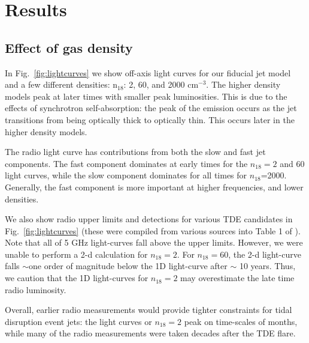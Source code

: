 \documentclass[usenatbib,fleqn]{mnras}
\begin{document}
\section{Results}
\label{sec:results}

\subsection{Effect of gas density}

In Fig.~\ref{fig:lightcurves} we show off-axis light curves for our
fiducial jet model and a few different densities: n$_{18}$: 2,
60, and 2000 cm$^{-3}$. The higher density models peak at later times with
smaller peak luminosities.  This is due to the effects of synchrotron
self-absorption: the peak of the emission occurs as the jet
transitions from being optically thick to optically thin. This occurs
later in the higher density models.

The radio light curve has contributions from both the slow and fast
jet components. The fast component dominates at early times for the
$n_{18}=2$ and 60 light curves, while the slow component dominates for
all times for $n_{18}$=2000. Generally, the fast
component is more important at higher frequencies, and lower
densities. 

We also show radio upper limits and detections for various TDE
candidates in Fig.~\ref{fig:lightcurves} (these were compiled from
various sources into Table 1 of \citealt{Mimica+2015}). Note that all
of 5 GHz light-curves fall above the upper limits. However, we were
unable to perform a 2-d calculation for $n_{18}=2$.  For $n_{18}=60$,
the 2-d light-curve falls $\sim$one order of magnitude below the 1D
light-curve after $\sim$ 10 years. Thus, we caution that the 1D
light-curves for $n_{18}=2$ may overestimate the late time radio
luminosity.

Overall, earlier radio measurements would provide tighter constraints
for tidal disruption event jets: the light curves or $n_{18}=2$ peak on
time-scales of months, while many of the radio measurements were taken
decades after the TDE flare.
\end{document}
